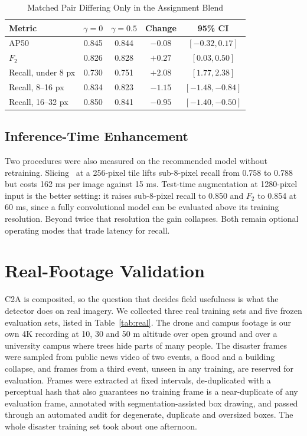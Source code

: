 \documentclass[conference,a4paper]{IEEEtran}
\begin{document}
\begin{table}[htbp]
\caption{Matched Pair Differing Only in the Assignment Blend}
\label{tab:assign}
\begin{center}
\small
\setlength{\tabcolsep}{4pt}
\begin{tabular}{|l|c|c|c|c|}
\hline
\textbf{Metric} & $\gamma = 0$ & $\gamma = 0.5$ & \textbf{Change} & \textbf{95\% CI} \\
\hline
AP50 & 0.845 & 0.844 & $-0.08$ & $[-0.32, 0.17]$ \\
\hline
$F_2$ & 0.826 & 0.828 & $+0.27$ & $[0.03, 0.50]$ \\
\hline
Recall, under 8 px & 0.730 & 0.751 & $\mathbf{+2.08}$ & $[1.77, 2.38]$ \\
\hline
Recall, 8--16 px & 0.834 & 0.823 & $-1.15$ & $[-1.48, -0.84]$ \\
\hline
Recall, 16--32 px & 0.850 & 0.841 & $-0.95$ & $[-1.40, -0.50]$ \\
\hline
\end{tabular}
\end{center}
\end{table}

\subsection{Inference-Time Enhancement}
Two procedures were also measured on the recommended model without retraining.
Slicing~\cite{akyon2022sahi} at a 256-pixel tile lifts sub-8-pixel recall from
0.758 to 0.788 but costs 162 ms per image against 15 ms. Test-time augmentation
at 1280-pixel input is the better setting: it raises sub-8-pixel recall to 0.850
and $F_2$ to 0.854 at 60 ms, since a fully convolutional model can be evaluated
above its training resolution. Beyond twice that resolution the gain collapses.
Both remain optional operating modes that trade latency for recall.

\section{Real-Footage Validation}
\label{sec:real}
C2A is composited, so the question that decides field usefulness is what the
detector does on real imagery. We collected three real training sets and five
frozen evaluation sets, listed in Table~\ref{tab:real}. The drone and campus
footage is our own 4K recording at 10, 30 and 50 m altitude over open ground and
over a university campus where trees hide parts of many people. The disaster
frames were sampled from public news video of two events, a flood and a building
collapse, and frames from a third event, unseen in any training, are reserved for
evaluation. Frames were extracted at fixed intervals, de-duplicated with a
perceptual hash that also guarantees no training frame is a near-duplicate of any
evaluation frame, annotated with segmentation-assisted box drawing, and passed
through an automated audit for degenerate, duplicate and oversized boxes. The
whole disaster training set took about one afternoon.
\end{document}
